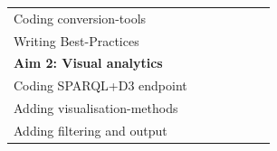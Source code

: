 \documentclass[twoside,fontsize=12pt]{article}
\begin{document}
\begin{table}[h]
\begin{center}
\begin{tabular}{lllllll}
\hspace*{1em} Coding conversion-tools           &                                                 \cellcolor[HTML]{656565}               &     \cellcolor[HTML]{656565}         &                      &                                                 &                                                 &                                                                                                \\
\hspace*{1em} Writing Best-Practices            &                                                 &                                                  \cellcolor[HTML]{656565}             &           &                                                 &                                                                                                  &                                                                                                \\
\textbf{Aim 2: Visual analytics}                &                                                 &                                                  \cellcolor[HTML]{343434}                        & \cellcolor[HTML]{343434}                        &                                                                                                                        &                                                 \\
\hspace*{1em} Coding SPARQL+D3 endpoint         &                                                 &                                                  \cellcolor[HTML]{656565}                        &                                                 &                                                                                                 &                                                 &                                                 \\
\hspace*{1em} Adding visualisation-methods      &                                                                                               & \cellcolor[HTML]{656565}                        & \cellcolor[HTML]{656565}                                                                         &                                                 &                                                 &                                                 \\
\hspace*{1em} Adding filtering and output                                                                                           &                                                 &  &                                                \cellcolor[HTML]{656565}   &                                                 &                                                 &                                                 \\

\end{tabular}
\end{center}
\end{table}
\end{document}
